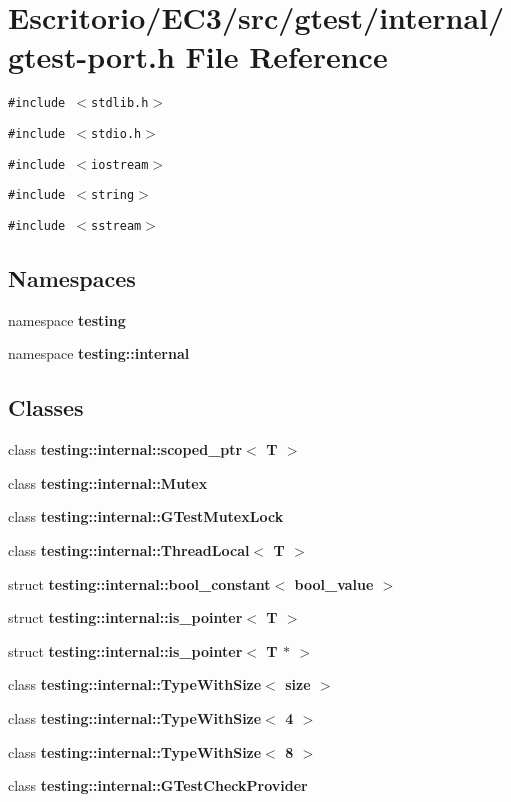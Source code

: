 \section{Escritorio/EC3/src/gtest/internal/gtest-port.h File Reference}
\label{gtest-port_8h}
{\tt \#include $<$stdlib.h$>$}\par
{\tt \#include $<$stdio.h$>$}\par
{\tt \#include $<$iostream$>$}\par
{\tt \#include $<$string$>$}\par
{\tt \#include $<$sstream$>$}\par
\subsection*{Namespaces}
\begin{CompactItemize}
\item 
namespace {\bf testing}
\item 
namespace {\bf testing::internal}
\end{CompactItemize}
\subsection*{Classes}
\begin{CompactItemize}
\item 
class {\bf testing::internal::scoped\_\-ptr$<$ T $>$}
\item 
class {\bf testing::internal::Mutex}
\item 
class {\bf testing::internal::GTestMutexLock}
\item 
class {\bf testing::internal::ThreadLocal$<$ T $>$}
\item 
struct {\bf testing::internal::bool\_\-constant$<$ bool\_\-value $>$}
\item 
struct {\bf testing::internal::is\_\-pointer$<$ T $>$}
\item 
struct {\bf testing::internal::is\_\-pointer$<$ T $\ast$ $>$}
\item 
class {\bf testing::internal::TypeWithSize$<$ size $>$}
\item 
class {\bf testing::internal::TypeWithSize$<$ 4 $>$}
\item 
class {\bf testing::internal::TypeWithSize$<$ 8 $>$}
\item 
class {\bf testing::internal::GTestCheckProvider}
\end{CompactItemize}
